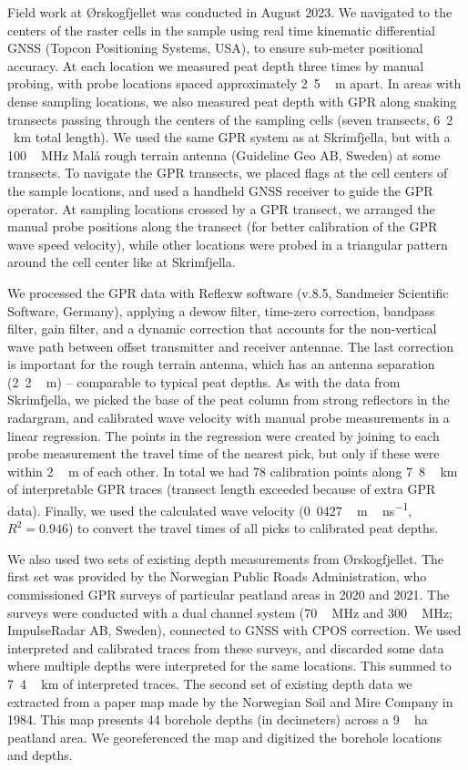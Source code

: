 \documentclass[soil, manuscript]{copernicus}
\begin{document}
Field work at Ørskogfjellet was conducted in August 2023.
We navigated to the centers of the raster cells in the sample using real time kinematic differential GNSS (Topcon Positioning Systems, USA), to ensure sub-meter positional accuracy.
At each location we measured peat depth three times by manual probing, with probe locations spaced approximately \unit{2.5\,m} apart.
In areas with dense sampling locations, we also measured peat depth with GPR along snaking transects passing through the centers of the sampling cells (seven transects, \unit{6.2\,km} total length).
We used the same GPR system as at Skrimfjella, but with a \unit{100\,MHz} Malå rough terrain antenna (Guideline Geo AB, Sweden) at some transects.
To navigate the GPR transects, we placed flags at the cell centers of the sample locations, and used a handheld GNSS receiver to guide the GPR operator.
At sampling locations crossed by a GPR transect, we arranged the manual probe positions along the transect (for better calibration of the GPR wave speed velocity), while other locations were probed in a triangular pattern around the cell center like at Skrimfjella.

We processed the GPR data with Reflexw software (v.8.5, Sandmeier Scientific Software, Germany), applying a dewow filter, time-zero correction, bandpass filter, gain filter, and a dynamic correction that accounts for the non-vertical wave path between offset transmitter and receiver antennae.
The last correction is important for the rough terrain antenna, which has an antenna separation (\unit{2.2\,m}) -- comparable to typical peat depths.
As with the data from Skrimfjella, we picked the base of the peat column from strong reflectors in the radargram, and calibrated wave velocity with manual probe measurements in a linear regression.
The points in the regression were created by joining to each probe measurement the travel time of the nearest pick, but only if these were within \unit{2\,m} of each other.
In total we had 78 calibration points along \unit{7.8\,km} of interpretable GPR traces (transect length exceeded because of extra GPR data).
Finally, we used the calculated wave velocity (\unit{0.0427\,m\,ns^{-1}}, \(R^2 = 0.946\)) to convert the travel times of all picks to calibrated peat depths.

We also used two sets of existing depth measurements from Ørskogfjellet.
The first set was provided by the Norwegian Public Roads Administration, who commissioned GPR surveys of particular peatland areas in 2020 and 2021.
The surveys were conducted with a dual channel system (\unit{70\,MHz} and \unit{300\,MHz}; ImpulseRadar AB, Sweden), connected to GNSS with CPOS correction.
We used interpreted and calibrated traces from these surveys, and discarded some data where multiple depths were interpreted for the same locations.
This summed to \unit{7.4\,km} of interpreted traces.
The second set of existing depth data we extracted from a paper map made by the Norwegian Soil and Mire Company in 1984.
This map presents 44 borehole depths (in decimeters) across a \unit{9\,ha} peatland area.
We georeferenced the map and digitized the borehole locations and depths.
\end{document}

